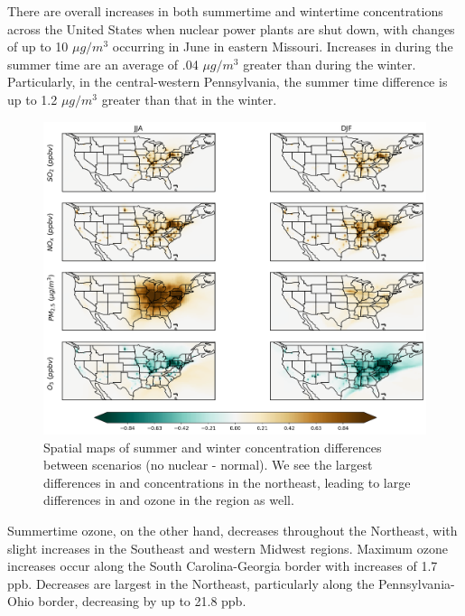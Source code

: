 \documentclass[12]{article}
\begin{document}
There are overall increases in both summertime and wintertime  concentrations across the United States when nuclear power plants are shut down, with changes of up to 10 $\mu g/m^3$ occurring in June in eastern Missouri. Increases in  during the summer time are an average of .04 $\mu g/m^3$ greater than during the winter. Particularly, in the central-western Pennsylvania, the summer time  difference is up to 1.2 $\mu g/m^3$ greater than that in the winter. 

\begin{figure}[!htbp]
    \centering
    \includegraphics[width=1.01\textwidth]{ego_nonuclear_project/Figures/summer_winter_national_dif.png}
    \caption{Spatial maps of summer and winter concentration differences between scenarios (no nuclear - normal). We see the largest differences in  and  concentrations in the northeast, leading to large differences in  and ozone in the region as well.} 
    \label{fig:summer_winter_dif}
\end{figure}

Summertime ozone, on the other hand, decreases throughout the Northeast, with slight increases in the Southeast and western Midwest regions. Maximum ozone increases occur along the South Carolina-Georgia border with increases of 1.7 ppb. Decreases are largest in the Northeast, particularly along the Pennsylvania-Ohio border, decreasing by up to 21.8 ppb. 
\end{document}
